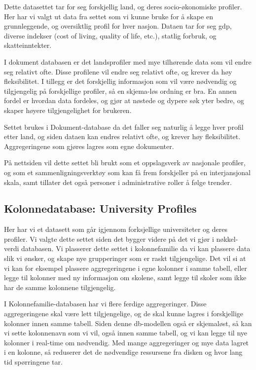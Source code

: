 Dette datasettet tar for seg forskjellig land, og deres socio-økonomiske profiler. Her har vi valgt ut data fra settet som vi kunne bruke for å skape en grunnleggende, og oversiktlig profil for hver nasjon. Dataen tar for seg gdp, diverse indekser (cost of living, quality of life, etc.), statlig forbruk, og skatteinntekter.

I dokument databasen er det landsprofiler med mye tilhørende data som vil endre seg relativt ofte. Disse profilene vil endre seg relativt ofte, og krever da høy fleksibilitet. I tillegg er det forskjellig informasjon som vil være nødvendig og tilgjengelig på forskjellige profiler, så en skjema-løs ordning er bra. En annen fordel er hvordan data fordeles, og gjør at nøstede og dypere søk yter bedre, og skaper høyere tilgjengelighet for brukeren.

Settet brukes i Dokument-database da det faller seg naturlig å legge hver profil etter land, og siden dataen kan endres relativt ofte, og krever høy fleksibilitet. Aggregeringene som gjøres lagres som egne dokumenter.

På nettsiden vil dette settet bli brukt som et oppslagsverk av nasjonale profiler, og som et sammenligningsverktøy som kan få frem forskjeller på en interjansjonal skala, samt tillater det også personer i administrative roller å følge trender.



\subsection{Kolonnedatabase: University Profiles}
Her har vi et datasett som går igjennom forksjellige universiteter og deres profiler. Vi valgte dette settet siden det bygger videre på det vi gjør i nøkkel-verdi databasen. 
Vi plasserer dette settet i kolonnefamilie da vi kan plassere data slik vi ønsker, og skape nye grupperinger som er raskt tilgjengelige. Det vil si at vi kan for eksempel plassere aggregeringene i egne kolonner i samme tabell, eller legge til kolonner med ny informasjon om skolene, samt legge til skoler som ikke har de samme kolonnene tilgjengelig.

I Kolonnefamilie-databasen har vi flere ferdige aggregeringer. Disse aggregeringene skal være lett tilgjengelige, og de skal kunne lagres i forskjellige kolonner innen samme tabell. Siden denne db-modellen også er skjemaløst, så kan vi sette kolonnenavn som vi vil, også innen samme tabell, og vi kan legge til nye kolonner i real-time om nødvendig. Med mange aggregeringer og mye data lagret i en kolonne, så reduserer det de nødvendige ressursene fra disken og hvor lang tid spørringene tar.


